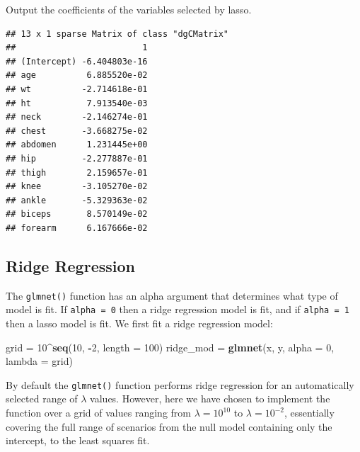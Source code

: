\documentclass[]{article}
\newenvironment{Shaded}{\begin{snugshade}}{\end{snugshade}}
\newcommand{\KeywordTok}[1]{\textcolor[rgb]{0.13,0.29,0.53}{\textbf{#1}}}
\newcommand{\DataTypeTok}[1]{\textcolor[rgb]{0.13,0.29,0.53}{#1}}
\newcommand{\DecValTok}[1]{\textcolor[rgb]{0.00,0.00,0.81}{#1}}
\newcommand{\StringTok}[1]{\textcolor[rgb]{0.31,0.60,0.02}{#1}}
\newcommand{\OperatorTok}[1]{\textcolor[rgb]{0.81,0.36,0.00}{\textbf{#1}}}
\newcommand{\NormalTok}[1]{#1}
\begin{document}
Output the coefficients of the variables selected by lasso.

\begin{Shaded}
\end{Shaded}

\begin{verbatim}
## 13 x 1 sparse Matrix of class "dgCMatrix"
##                         1
## (Intercept) -6.404803e-16
## age          6.885520e-02
## wt          -2.714618e-01
## ht           7.913540e-03
## neck        -2.146274e-01
## chest       -3.668275e-02
## abdomen      1.231445e+00
## hip         -2.277887e-01
## thigh        2.159657e-01
## knee        -3.105270e-02
## ankle       -5.329363e-02
## biceps       8.570149e-02
## forearm      6.167666e-02
\end{verbatim}

\subsection{Ridge Regression}\label{ridge-regression}

The \texttt{glmnet()} function has an alpha argument that determines
what type of model is fit. If \texttt{alpha\ =\ 0} then a ridge
regression model is fit, and if \texttt{alpha\ =\ 1} then a lasso model
is fit. We first fit a ridge regression model:

\begin{Shaded}
\begin{Highlighting}[]
\NormalTok{grid =}\StringTok{ }\DecValTok{10}\OperatorTok{^}\KeywordTok{seq}\NormalTok{(}\DecValTok{10}\NormalTok{, }\OperatorTok{-}\DecValTok{2}\NormalTok{, }\DataTypeTok{length =} \DecValTok{100}\NormalTok{)}
\NormalTok{ridge_mod =}\StringTok{ }\KeywordTok{glmnet}\NormalTok{(x, y, }\DataTypeTok{alpha =} \DecValTok{0}\NormalTok{, }\DataTypeTok{lambda =}\NormalTok{ grid)}
\end{Highlighting}
\end{Shaded}

By default the \texttt{glmnet()} function performs ridge regression for
an automatically selected range of \(\lambda\) values. However, here we
have chosen to implement the function over a grid of values ranging from
\(\lambda = 10^{10}\) to \(\lambda = 10^{-2}\), essentially covering the
full range of scenarios from the null model containing only the
intercept, to the least squares fit.
\end{document}

